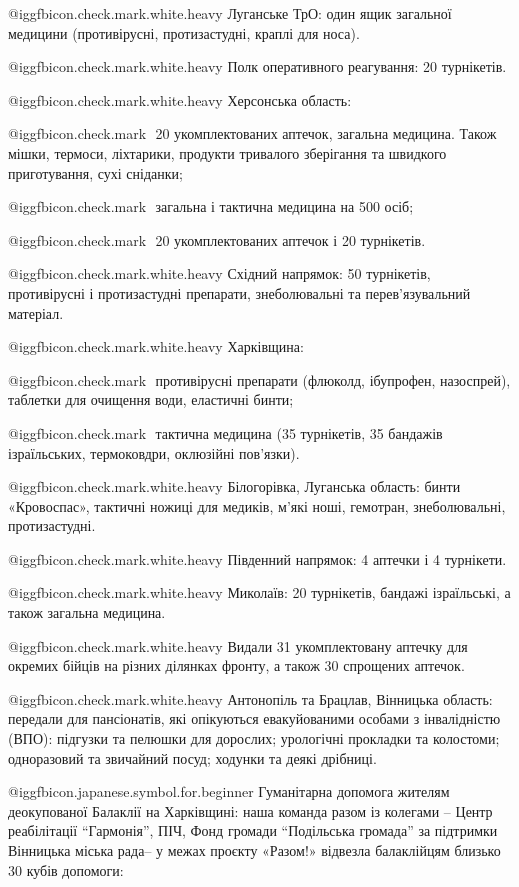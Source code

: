  @igg{fbicon.check.mark.white.heavy} ️Луганське ТрО: один ящик загальної медицини (противірусні, протизастудні,
краплі для носа).

 @igg{fbicon.check.mark.white.heavy} ️Полк оперативного реагування: 20 турнікетів. 

 @igg{fbicon.check.mark.white.heavy} ️Херсонська область: 

 @igg{fbicon.check.mark} ️ 20 укомплектованих аптечок, загальна медицина. Також мішки, термоси,
ліхтарики, продукти тривалого зберігання та швидкого приготування, сухі
сніданки;

 @igg{fbicon.check.mark} ️ загальна і тактична медицина на 500 осіб;

 @igg{fbicon.check.mark} ️ 20 укомплектованих аптечок і 20 турнікетів.

 @igg{fbicon.check.mark.white.heavy} ️Східний напрямок: 50 турнікетів, противірусні і протизастудні препарати,
знеболювальні та перев'язувальний матеріал. 

@igg{fbicon.check.mark.white.heavy} ️Харківщина:

@igg{fbicon.check.mark} ️ противірусні препарати (флюколд, ібупрофен, назоспрей), таблетки для очищення
води, еластичні бинти;

@igg{fbicon.check.mark} ️ тактична медицина (35 турнікетів, 35 бандажів ізраїльських, термоковдри,
оклюзійні пов'язки).

@igg{fbicon.check.mark.white.heavy} ️Білогорівка, Луганська область: бинти «Кровоспас», тактичні ножиці для
медиків, м'які ноші, гемотран,  знеболювальні, протизастудні. 

@igg{fbicon.check.mark.white.heavy} ️Південний напрямок: 4 аптечки і 4 турнікети. 

@igg{fbicon.check.mark.white.heavy} ️Миколаїв:  20 турнікетів, бандажі ізраїльські, а також загальна медицина. 

@igg{fbicon.check.mark.white.heavy} ️Видали 31 укомплектовану аптечку для
окремих бійців на різних ділянках фронту, а також 30 спрощених аптечок.

@igg{fbicon.check.mark.white.heavy} ️Антонопіль та Брацлав, Вінницька область: передали для пансіонатів, які
опікуються евакуйованими особами з інвалідністю (ВПО): підгузки та пелюшки для
дорослих; урологічні прокладки та колостоми; одноразовий та звичайний посуд;
ходунки та деякі дрібниці.

@igg{fbicon.japanese.symbol.for.beginner} Гуманітарна допомога жителям
деокупованої Балаклії на Харківщині: наша команда разом із колегами – Центр
реабілітації \enquote{Гармонія}, ПІЧ, Фонд  громади \enquote{Подільська громада} за підтримки
Вінницька міська рада– у межах проєкту «Разом!» відвезла балаклійцям  близько
30 кубів допомоги: 

